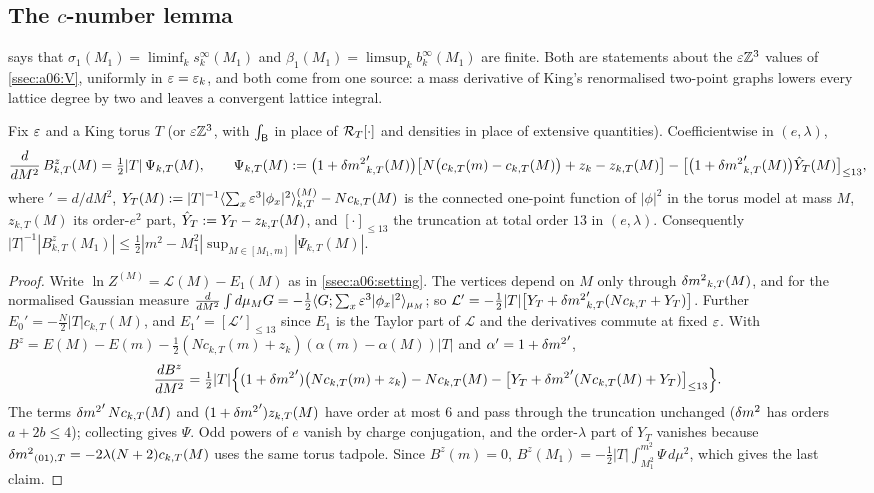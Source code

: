 \subsection{The $c$-number lemma}\label{ssec:a06:T2}

 says that $\sigma_1(M_1)=\liminf_ks^\infty_k(M_1)$ and $\beta_1(M_1)=\limsup_kb^\infty_k(M_1)$ are finite. Both are statements about the $\varepsilon\mathbb Z^3$ values of \cref{ssec:a06:V}, uniformly in $\varepsilon=\varepsilon_k$, and both come from one source: a mass derivative of King's renormalised two-point graphs lowers every lattice degree by two and leaves a convergent lattice integral.

\begin{proposition}\label{prop:a06:D}
Fix $\varepsilon$ and a King torus $T$ (or $\varepsilon\mathbb Z^3$, with $\int_{\mathsf B}$ in place of $\mathcal R_{T}[\cdot]$ and densities in place of extensive quantities). Coefficientwise in $(e,\lambda)$,
\[
\frac{d}{dM^2}\,B^z_{k,T}(M)=\tfrac12|T|\,\Psi_{k,T}(M),\qquad
\Psi_{k,T}(M):=\big(1+{\delta m^2}_{k,T}'(M)\big)\big[N\big(c_{k,T}(m)-c_{k,T}(M)\big)+z_k-z_{k,T}(M)\big]-\big[\big(1+{\delta m^2}'_{k,T}(M)\big)\hat Y_{T}(M)\big]_{\le13},
\]
where $'=d/dM^2$, $Y_T(M):=|T|^{-1}\langle\sum_x\varepsilon^3|\phi_x|^2\rangle^{(M)}_{k,T}-Nc_{k,T}(M)$ is the connected one-point function of $|\phi|^2$ in the torus model at mass $M$, $z_{k,T}(M)$ its order-$e^2$ part, $\hat Y_T:= Y_T-z_{k,T}(M)$, and $[\cdot]_{\le13}$ the truncation at total order $13$ in $(e,\lambda)$. Consequently $|T|^{-1}|B^z_{k,T}(M_1)|\le\frac12|m^2-M_1^2|\sup_{M\in[M_1,m]}|\Psi_{k,T}(M)|$.
\end{proposition}

\begin{proof}
Write $\ln Z^{(M)}=\mathcal L(M)-E_1(M)$ as in \cref{ssec:a06:setting}. The vertices depend on $M$ only through ${\delta m^2}_{k,T}(M)$, and for the normalised Gaussian measure $\frac{d}{dM^2}\int d\mu_MG=-\frac12\langle G;\sum_x\varepsilon^3|\phi_x|^2\rangle_{\mu_M}$; so $\mathcal L'=-\frac12|T|\big[Y_T+{\delta m^2}'_{k,T}(Nc_{k,T}+Y_T)\big]$. Further $E_0'=-\frac N2|T|c_{k,T}(M)$, and $E_1'=[\mathcal L']_{\le13}$ since $E_1$ is the Taylor part of $\mathcal L$ and the derivatives commute at fixed $\varepsilon$. With $B^z=E(M)-E(m)-\frac12(Nc_{k,T}(m)+z_k)(\alpha(m)-\alpha(M))|T|$ and $\alpha'=1+{\delta m^2}'$,
\[
\frac{dB^z}{dM^2}=\tfrac12|T|\Big\{(1+{\delta m^2}')\big(Nc_{k,T}(m)+z_k\big)-Nc_{k,T}(M)-\big[Y_T+{\delta m^2}'(Nc_{k,T}(M)+Y_T)\big]_{\le13}\Big\}.
\]
The terms ${\delta m^2}'\,Nc_{k,T}(M)$ and $(1+{\delta m^2}')z_{k,T}(M)$ have order at most $6$ and pass through the truncation unchanged (${\delta m^2}$ has orders $a+2b\le4$); collecting gives $\Psi$. Odd powers of $e$ vanish by charge conjugation, and the order-$\lambda$ part of $Y_T$ vanishes because ${\delta m^2}_{(01),T}=-2\lambda(N+2)c_{k,T}(M)$ uses the same torus tadpole. Since $B^z(m)=0$, $B^z(M_1)=-\frac12|T|\int_{M_1^2}^{m^2}\Psi\,d\mu^2$, which gives the last claim.
\end{proof}


